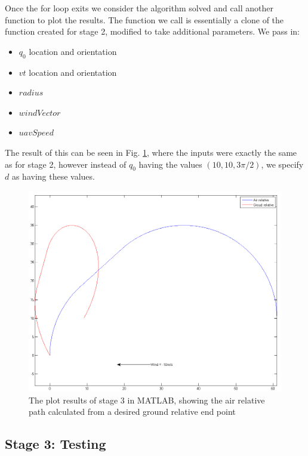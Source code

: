 Once the for loop exits we consider the algorithm solved and call another function to plot the results. The function we call is essentially a clone of the function created for stage 2, modified to take additional parameters. We pass in:

\begin{itemize}
	\item $q_0$ location and orientation
	\item $vt$ location and orientation
	\item $radius$
	\item $windVector$
	\item $uavSpeed$
\end{itemize}

The result of this can be seen in Fig. \ref{fig:pp3demo}, where the inputs were exactly the same as for stage 2, however instead of $q_0$ having the values $(10,10,3\pi/2)$, we specify $d$ as having these values.

\begin{figure}[htbp!] 
\centering    
\includegraphics[width=\textwidth]{PP3_Demo}
\caption[stage 3: Generating an Air Relative Path Based on Desired Ground Relative Destination in MATLAB]{The plot results of stage 3 in MATLAB, showing the air relative path calculated from a desired ground relative end point}
\label{fig:pp3demo}
\end{figure}


\subsection{Stage 3: Testing}
\label{task1:stage3:testing}

